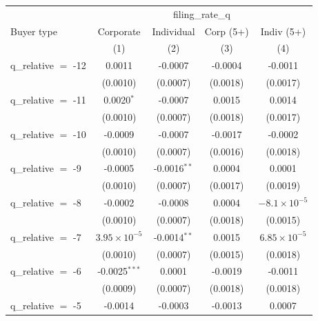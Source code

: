 
\begingroup
\centering
\begin{tabular}{lcccc}
   \toprule
    & \multicolumn{4}{c}{filing\_rate\_q}\\
   Buyer type           & Corporate             & Individual             & Corp (5+)     & Indiv (5+) \\   
                        & (1)                   & (2)                    & (3)           & (4)\\  
   \midrule 
   q\_relative $=$ -12  & 0.0011                & -0.0007                & -0.0004       & -0.0011\\   
                        & (0.0010)              & (0.0007)               & (0.0018)      & (0.0017)\\   
   q\_relative $=$ -11  & 0.0020$^{*}$          & -0.0007                & 0.0015        & 0.0014\\   
                        & (0.0010)              & (0.0007)               & (0.0018)      & (0.0017)\\   
   q\_relative $=$ -10  & -0.0009               & -0.0007                & -0.0017       & -0.0002\\   
                        & (0.0010)              & (0.0007)               & (0.0016)      & (0.0018)\\   
   q\_relative $=$ -9   & -0.0005               & -0.0016$^{**}$         & 0.0004        & 0.0001\\   
                        & (0.0010)              & (0.0007)               & (0.0017)      & (0.0019)\\   
   q\_relative $=$ -8   & -0.0002               & -0.0008                & 0.0004        & $-8.1\times 10^{-5}$\\    
                        & (0.0010)              & (0.0007)               & (0.0018)      & (0.0015)\\   
   q\_relative $=$ -7   & $3.95\times 10^{-5}$  & -0.0014$^{**}$         & 0.0015        & $6.85\times 10^{-5}$\\    
                        & (0.0010)              & (0.0007)               & (0.0015)      & (0.0018)\\   
   q\_relative $=$ -6   & -0.0025$^{***}$       & 0.0001                 & -0.0019       & -0.0011\\   
                        & (0.0009)              & (0.0007)               & (0.0018)      & (0.0018)\\   
   q\_relative $=$ -5   & -0.0014               & -0.0003                & -0.0013       & 0.0007\\   

\end{tabular}
